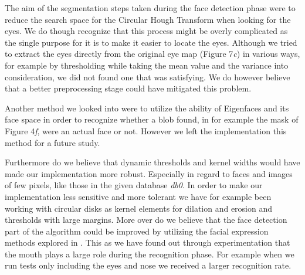 The aim of the segmentation steps taken during the face detection phase were to reduce the search space for the Circular Hough Transform when looking for the eyes. We do though recognize that this process might be overly complicated as the single purpose for it is to make it easier to locate the eyes. Although we tried to extract the eyes directly from the original eye map (Figure 7\textit{c}) in various ways, for example by thresholding while taking the mean value and the variance into consideration, we did not found one that was satisfying. We do however believe that a better preprocessing stage could have mitigated this problem.

Another method we looked into were to utilize the ability of Eigenfaces and its face space in order to recognize whether a blob found, in for example the mask of Figure 4\textit{f}, were an actual face or not. However we left the implementation this method for a future study.

Furthermore do we believe that dynamic thresholds and kernel widths would have made our implementation more robust. Especially in regard to faces and images of few pixels, like those in the given database \textit{db0}. In order to make our implementation less sensitive and more tolerant we have for example been working with circular disks as kernel elements for dilation and erosion and thresholds with large margins. More over do we believe that the face detection part of the algorithm could be improved by utilizing the facial expression methods explored in \cite{facialExpressions}. This as we have found out through experimentation that the mouth plays a large role during the recognition phase. For example when we run tests only including the eyes and nose we received a larger recognition rate.


